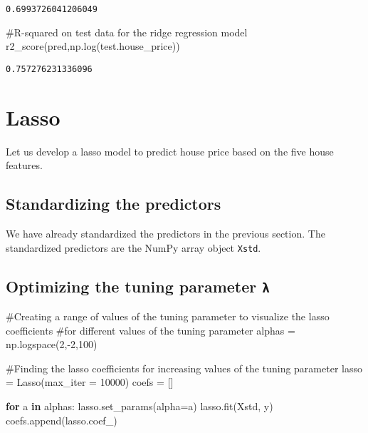 \documentclass[
  letterpaper,
  DIV=11,
  numbers=noendperiod]{scrreprt}
\newenvironment{Shaded}{\begin{snugshade}}{\end{snugshade}}
\newcommand{\CommentTok}[1]{\textcolor[rgb]{0.37,0.37,0.37}{#1}}
\newcommand{\ControlFlowTok}[1]{\textcolor[rgb]{0.00,0.23,0.31}{\textbf{#1}}}
\newcommand{\DecValTok}[1]{\textcolor[rgb]{0.68,0.00,0.00}{#1}}
\newcommand{\KeywordTok}[1]{\textcolor[rgb]{0.00,0.23,0.31}{\textbf{#1}}}
\newcommand{\NormalTok}[1]{\textcolor[rgb]{0.00,0.23,0.31}{#1}}
\newcommand{\OperatorTok}[1]{\textcolor[rgb]{0.37,0.37,0.37}{#1}}
\begin{document}
\begin{verbatim}
0.6993726041206049
\end{verbatim}

\begin{Shaded}
\begin{Highlighting}[]
\CommentTok{\#R{-}squared on test data for the ridge regression model}
\NormalTok{r2\_score(pred,np.log(test.house\_price))}
\end{Highlighting}
\end{Shaded}

\begin{verbatim}
0.757276231336096
\end{verbatim}

\section{Lasso}\label{lasso}

Let us develop a lasso model to predict house price based on the five
house features.

\subsection{Standardizing the
predictors}\label{standardizing-the-predictors-1}

We have already standardized the predictors in the previous section. The
standardized predictors are the NumPy array object \texttt{Xstd}.

\subsection{\texorpdfstring{Optimizing the tuning parameter
\texttt{λ}}{Optimizing the tuning parameter λ}}\label{optimizing-the-tuning-parameter-ux3bb-1}

\begin{Shaded}
\begin{Highlighting}[]
\CommentTok{\#Creating a range of values of the tuning parameter to visualize the lasso coefficients}
\CommentTok{\#for different values of the tuning parameter}
\NormalTok{alphas }\OperatorTok{=}\NormalTok{ np.logspace(}\DecValTok{2}\NormalTok{,}\OperatorTok{{-}}\DecValTok{2}\NormalTok{,}\DecValTok{100}\NormalTok{)}
\end{Highlighting}
\end{Shaded}

\begin{Shaded}
\begin{Highlighting}[]
\CommentTok{\#Finding the lasso coefficients for increasing values of the tuning parameter}
\NormalTok{lasso }\OperatorTok{=}\NormalTok{ Lasso(max\_iter }\OperatorTok{=} \DecValTok{10000}\NormalTok{)}
\NormalTok{coefs }\OperatorTok{=}\NormalTok{ []}

\ControlFlowTok{for}\NormalTok{ a }\KeywordTok{in}\NormalTok{ alphas:}
\NormalTok{    lasso.set\_params(alpha}\OperatorTok{=}\NormalTok{a)}
\NormalTok{    lasso.fit(Xstd, y)}
\NormalTok{    coefs.append(lasso.coef\_)}
\end{Highlighting}
\end{Shaded}
\end{document}

